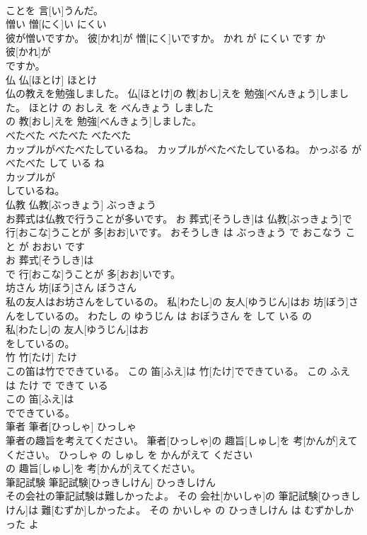 \documentclass[8pt]{extreport}
\begin{document}
\begin{CJK}{UTF8}{min}
\\	ことを 言[い]うんだ。			
\\	憎い	憎[にく]い	にくい	
\\	彼が憎いですか。	彼[かれ]が 憎[にく]いですか。	かれ が にくい です か	
\\	彼[かれ]が
\\	ですか。			
\\	仏	仏[ほとけ]	ほとけ	
\\	仏の教えを勉強しました。	仏[ほとけ]の 教[おし]えを 勉強[べんきょう]しました。	ほとけ の おしえ を べんきょう しました	
\\	の 教[おし]えを 勉強[べんきょう]しました。			
\\	べたべた	べたべた	べたべた	
\\	カップルがべたべたしているね。	カップルがべたべたしているね。	かっぷる が べたべた して いる ね	
\\	カップルが
\\	しているね。			
\\	仏教	仏教[ぶっきょう]	ぶっきょう	
\\	お葬式は仏教で行うことが多いです。	お 葬式[そうしき]は 仏教[ぶっきょう]で 行[おこな]うことが 多[おお]いです。	おそうしき は ぶっきょう で おこなう こと が おおい です	
\\	お 葬式[そうしき]は
\\	で 行[おこな]うことが 多[おお]いです。			
\\	坊さん	坊[ぼう]さん	ぼうさん	
\\	私の友人はお坊さんをしているの。	私[わたし]の 友人[ゆうじん]はお 坊[ぼう]さんをしているの。	わたし の ゆうじん は おぼうさん を して いる の	
\\	私[わたし]の 友人[ゆうじん]はお
\\	をしているの。			
\\	竹	竹[たけ]	たけ	
\\	この笛は竹でできている。	この 笛[ふえ]は 竹[たけ]でできている。	この ふえ は たけ で できて いる	
\\	この 笛[ふえ]は
\\	でできている。			
\\	筆者	筆者[ひっしゃ]	ひっしゃ	
\\	筆者の趣旨を考えてください。	筆者[ひっしゃ]の 趣旨[しゅし]を 考[かんが]えてください。	ひっしゃ の しゅし を かんがえて ください	
\\	の 趣旨[しゅし]を 考[かんが]えてください。			
\\	筆記試験	筆記試験[ひっきしけん]	ひっきしけん	
\\	その会社の筆記試験は難しかったよ。	その 会社[かいしゃ]の 筆記試験[ひっきしけん]は 難[むずか]しかったよ。	その かいしゃ の ひっきしけん は むずかしかった よ	

\end{CJK}
\end{document}
